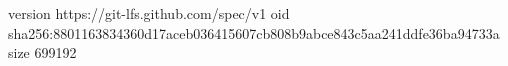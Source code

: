 version https://git-lfs.github.com/spec/v1
oid sha256:8801163834360d17aceb036415607cb808b9abce843c5aa241ddfe36ba94733a
size 699192
